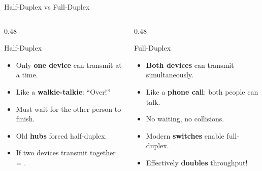 \documentclass[aspectratio=169]{beamer}  %
\begin{document}
\begin{frame}{Half-Duplex vs Full-Duplex}
    \begin{columns}[T]
        \begin{column}{0.48\textwidth}
            \begin{block}{Half-Duplex}
                \begin{itemize}
                    \item Only \textbf{one device} can transmit at a time.
                    \item Like a \textbf{walkie-talkie}: ``Over!''
                    \item Must wait for the other person to finish.
                    \item Old \textbf{hubs} forced half-duplex.
                    \item If two devices transmit together = .
                \end{itemize}
                
                \vspace{0.5em}
                \centering
            \end{block}
        \end{column}
        \begin{column}{0.48\textwidth}
            \begin{block}{Full-Duplex}
                \begin{itemize}
                    \item \textbf{Both devices} can transmit simultaneously.
                    \item Like a \textbf{phone call}: both people can talk.
                    \item No waiting, no collisions.
                    \item Modern \textbf{switches} enable full-duplex.
                    \item Effectively \textbf{doubles} throughput!
                \end{itemize}
                

\end{block}
\end{column}
\end{columns}
\end{frame}
\end{document}
